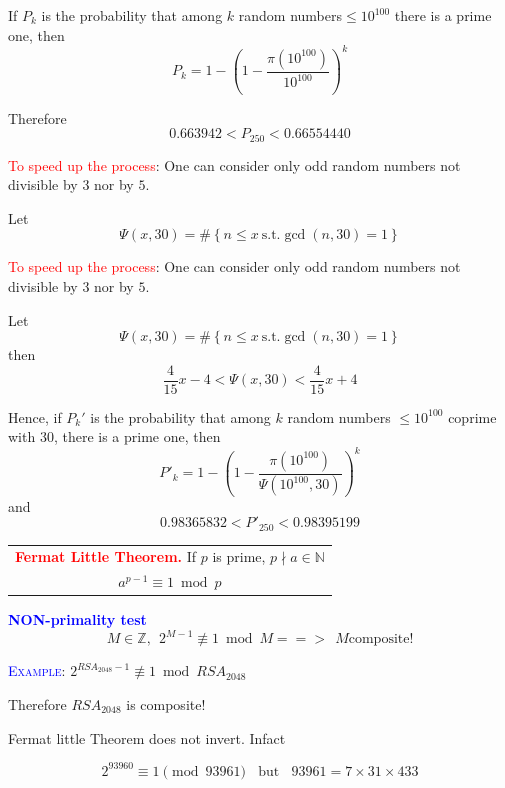 \documentclass[landscape,display]{powersem} %
\newcommand{\heading}[1]{%
 \begin{center}
  \large\bf
  \shadowbox{{\textcolor{conceptcolor}{#1}}}%
 \end{center}
 \vspace{1ex minus 1ex}}
\begin{document}
\begin{slide}
If $P_{k}$ is the probability that among $k$ random numbers$\leq
10^{100}$ there is a prime one, then\pause
$$P_k=1-\left(1-\frac{\pi(10^{100})}{10^{100}}\right)^k$$\pause

Therefore
$$0.663942
<P_{250}<
 0.66554440
$$
\bigskip\pause

\textcolor{red}{To speed up the process}: One can
consider only odd random numbers not divisible by
$3$ nor by $5$.\pause

Let
$$\Psi(x,30)=\#\left\{n\leq x\ \textrm{s.t.} \gcd(n,30)=1\right\}$$

\end{slide}

\begin{slide}
\textcolor{red}{To speed up the process}: One can
consider only odd random numbers not divisible by
$3$ nor by $5$.\pause

Let
$$\Psi(x,30)=\#\left\{n\leq x\ \textrm{s.t.} \gcd(n,30)=1\right\}$$
then\pause
$$\frac{4}{15}x-4<\Psi(x,30)<\frac{4}{15}x+4$$\pause

Hence, if $P_k'$ is the probability that among $k$ random numbers $\leq 10^{100}$
coprime with 30, there is a prime one, then\pause
$$P'_k=1-\left(1-\frac{\pi(10^{100})}{\Psi(10^{100},30)}\right)^k$$\pause
and
$$0.98365832
<P'_{250}<
 0.98395199$$
\end{slide}


\begin{slide}
\heading{\textsl{B.} Primality test}\pause


\begin{center}
\begin{tabular}{|c|}
\hline \textbf{\textcolor{red}{Fermat Little Theorem.}} If $p$ is prime, $p\nmid a\in{\mathbb N}$\\
$a^{p-1}\equiv1\bmod p$
\\\hline\end{tabular}
\end{center}\pause
\bigskip

\textbf{\textcolor{blue}{NON-primality test}}
$$M\in{\mathbb Z},\ \ 2^{M-1}\not\equiv 1\bmod M =\!\!\!=\!\!\!>\ \  M \textrm{composite!}$$\pause

\textsc{\textcolor{blue}{Example}:} $2^{RSA_{2048}-1}\not\equiv1\bmod RSA_{2048}$\\
\centerline{Therefore $RSA_{2048}$ is composite!}\pause

Fermat little Theorem does not invert. Infact\pause

$$2^{93960}\equiv 1\pmod{93961}\ \ \ \ \textrm{but}\ \ \ \ 93961
=7\times31\times433$$
 \end{slide}
\end{document}
